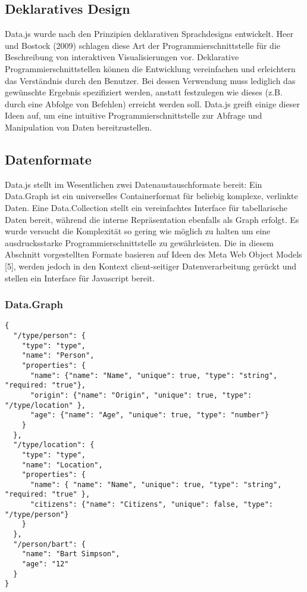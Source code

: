 \documentclass[runningheads]{llncs}
\begin{document}
\subsection{Deklaratives Design}


Data.js wurde nach den Prinzipien deklarativen Sprachdesigns entwickelt. Heer und Bostock (2009) schlagen diese Art der Programmierschnittstelle für die Beschreibung von interaktiven Visualisierungen vor. Deklarative Programmierschnittstellen können die Entwicklung vereinfachen und erleichtern das Verständnis durch den Benutzer. Bei dessen Verwendung muss lediglich das gewünschte Ergebnis spezifiziert werden, anstatt festzulegen wie dieses (z.B. durch eine Abfolge von Befehlen) erreicht werden soll. Data.js greift einige dieser Ideen auf, um eine intuitive Programmierschnittstelle zur Abfrage und Manipulation von Daten bereitzustellen.

\subsection{Datenformate}


Data.js stellt im Wesentlichen zwei Datenaustauschformate bereit: Ein Data.Graph ist ein universelles Containerformat für beliebig komplexe, verlinkte Daten. Eine Data.Collection stellt ein vereinfachtes Interface für tabellarische Daten bereit, während die interne Repräsentation ebenfalls als Graph erfolgt. Es wurde versucht die Komplexität so gering wie möglich zu halten um eine ausdrucksstarke Programmierschnittstelle zu gewährleisten. Die in diesem Abschnitt vorgestellten Formate basieren auf Ideen des Meta Web Object Models [5], werden jedoch in den Kontext client-seitiger Datenverarbeitung gerückt und stellen ein Interface für Javascript bereit.

\subsubsection{Data.Graph}
\begin{verbatim}
{
  "/type/person": {
    "type": "type",
    "name": "Person",
    "properties": {
      "name": {"name": "Name", "unique": true, "type": "string", "required: "true"},
      "origin": {"name": "Origin", "unique": true, "type": "/type/location" },
      "age": {"name": "Age", "unique": true, "type": "number"}
    }
  },
  "/type/location": {
    "type": "type",
    "name": "Location",
    "properties": {
      "name": { "name": "Name", "unique": true, "type": "string", "required: "true" },
      "citizens": {"name": "Citizens", "unique": false, "type": "/type/person"}
    }
  },
  "/person/bart": {
    "name": "Bart Simpson",
    "age": "12"
  }
}
\end{verbatim}
\end{document}

